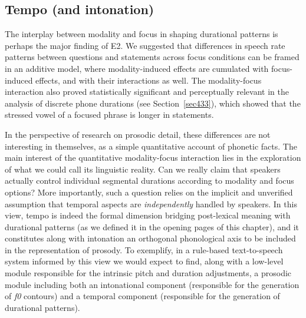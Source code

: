 \subsection{Tempo (and intonation)}\label{sec452}
The interplay between modality and focus in shaping durational patterns is perhaps the major finding of E2. We suggested that differences in speech rate patterns between questions and statements across focus conditions can be framed in an additive model, where modality-induced effects are cumulated with focus-induced effects, and with their interactions as well. The modality-focus interaction also proved statistically significant and perceptually relevant in the analysis of discrete phone durations (see Section~\ref{sec433}), which showed that the stressed vowel of a focused phrase is longer in statements. 

In the perspective of research on prosodic detail, these differences are not interesting in themselves, as a simple quantitative account of phonetic facts. The main interest of the quantitative modality-focus interaction lies in the exploration of what we could call its linguistic reality. Can we really claim that speakers actually control individual segmental durations according to modality and focus options? More importantly, such a question relies on the implicit and unverified assumption that temporal aspects are \textit{independently} handled by speakers. In this view, tempo is indeed the formal dimension bridging post-lexical meaning with durational patterns (as we defined it in the opening pages of this chapter), and it constitutes along with intonation an orthogonal phonological axis to be included in the representation of prosody. To exemplify, in a rule-based text-to-speech system informed by this view we would expect to find, along with a low-level module responsible for the intrinsic pitch and duration adjustments, a prosodic module including both an intonational component (responsible for the generation of \textit{f0} contours) and a temporal component (responsible for the generation of durational patterns).

